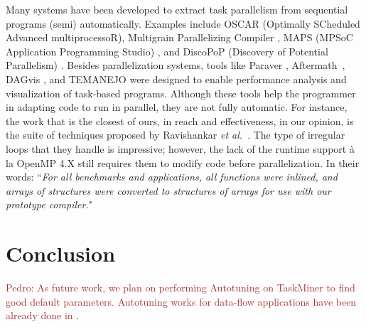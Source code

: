 \documentclass[sigplan,10pt,review,anonymous]{acmart}
\newcommand{\pedro}[1]{\noindent\textcolor{brown}{Pedro: {#1}}}
\newcommand{\pedro}[1]{}
\newcommand\Taskminer{\mbox{\textsf{TaskMiner}}}
\begin{document}
Many systems have been developed to extract task parallelism from sequential
programs (semi) automatically.
Examples include OSCAR
(Optimally SCheduled Advanced multiprocessoR), Multigrain Parallelizing
Compiler \cite{ishizaka:journal:2000, kasahara:iwlcpc:2000},  MAPS (MPSoC
Application Programming  Studio) \cite{castrillon:tii:2013, ceng:dac:2008}, and
DiscoPoP (Discovery of Potential Parallelism) \cite{discopop, li:jss:2016}.
Besides parallelization systems, tools like Paraver \cite{extrae, paraver},
Aftermath~\cite{drebes:hipeac:2014}, DAGvis \cite{huynh:wvpa:2015}, and TEMANEJO
\cite{brinkmann:parco:2011, brinkmann:journal:2013, temanejo} were  designed to
enable performance analysis and visualization of task-based programs.
Although these tools help the programmer in adapting code
to run in parallel, they are not fully automatic.
For instance, the work that is the closest of ours, in reach and effectiveness,
in our opinion, is the suite of techniques proposed by Ravishankar {\em et
al.}~\cite{Ravishankar14}.
The type of irregular loops that they handle is impressive; however,
the lack of the runtime support \`{a} la OpenMP 4.X still requires them to
modify code before parallelization.
In their words: ``{\em For all benchmarks and applications, all functions were 
inlined, and arrays of structures were converted to structures of arrays for use
with our prototype compiler.}"


\section{Conclusion}
\label{sec:conc}

\pedro{As future work, we plan on performing Autotuning on {\Taskminer} to find good default parameters.
Autotuning works for data-flow applications have been already done in \cite{Trancoso17, Emani15}}.


\end{document}
